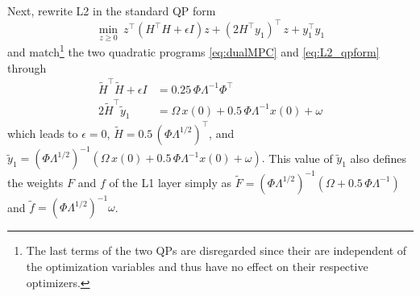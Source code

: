 Next, rewrite L2 in the standard QP form
\begin{equation}
	\label{eq:L2_qpform}
	\min_{z \geq 0} \ z^\top(H^\top H + \epsilon I )z + (2H^\top y_1)^\top \, z + y_1^\top y_1
\end{equation}
and match\footnote{The last terms of the two QPs are disregarded since their are independent of the optimization variables and thus have no effect on their respective optimizers.} the two quadratic programs \eqref{eq:dualMPC} and \eqref{eq:L2_qpform} through  %
\begin{subequations}
	\label{eq:Landg1}
	\begin{align}
		\tilde{H}^\top \tilde{H} + \epsilon I & = 0.25 \, \Phi \Lambda^{-1} \Phi^\top \\
		2 \tilde{H}^\top \tilde{y}_1 & = \Omega \, x(0) + 0.5 \, \Phi \Lambda^{-1}x(0) + \omega %
	\end{align}
\end{subequations}
which leads to $\epsilon = 0$, $\tilde{H} = 0.5 \, (\Phi \Lambda^{1/2})^\top$, and $\tilde{y}_1 = (\Phi \Lambda^{1/2})^{-1} (\Omega \, x(0) + 0.5 \, \Phi \Lambda^{-1} x(0) + \omega).$ This value of $\tilde y_1$ also defines the weights $F$ and $f$ of the L1 layer simply as $\tilde{F} = (\Phi \Lambda^{1/2})^{-1}(\Omega+0.5 \, \Phi \Lambda^{-1})$ and $\tilde{f} = (\Phi \Lambda^{1/2})^{-1}\omega$. 

